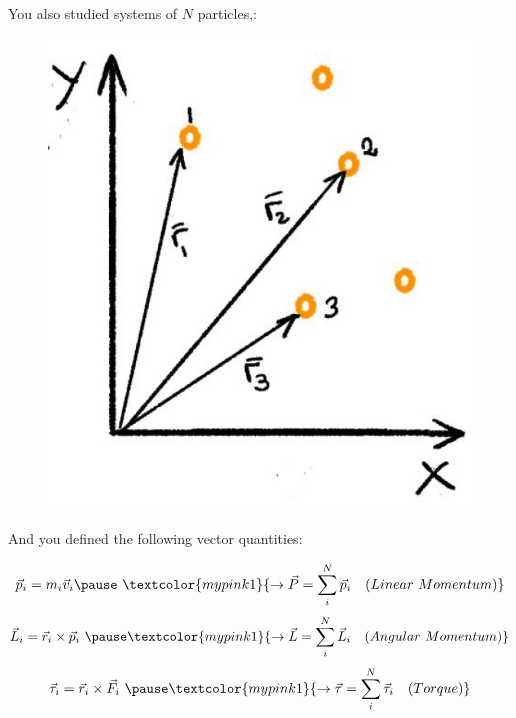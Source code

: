 \documentclass[]{beamer}
\begin{document}

\begin{frame}

You also studied systems of $N$ particles,: 




  \begin{figure}[h!]
    \begin{center}
      \includegraphics[height=2.in]{images/1.jpg}
    \end{center}
  \end{figure}

  







 \end{frame}

 

\begin{frame}

 And you defined the following vector quantities: 
  

  
    \pause
  
    \begin{equation}
      \vec{p}_i=m_i\vec{v}_i \pause ~ \textcolor{mypink1}{\rightarrow \vec{P}=\sum^N_i \vec{p}_i~~~(Linear~Momentum)}
    \end{equation}
    \pause
    \begin{equation}
      \vec{L}_i=\vec{r}_i\times\vec{p}_i ~ \pause \textcolor{mypink1}{\rightarrow \vec{L}=\sum^N_i \vec{L}_i~~~(Angular~Momentum)}
    \end{equation}
    \pause
    \begin{equation}
      \vec{\tau}_i=\vec{r}_i\times\vec{F}_i ~ \pause \textcolor{mypink1}{\rightarrow \vec{\tau}=\sum^N_i \vec{\tau}_i~~~(Torque)}
    \end{equation}

  
  
  
  
  
   \end{frame}
\end{document}
